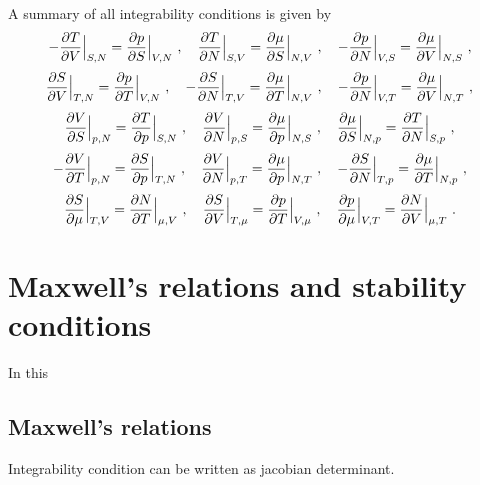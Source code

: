    A summary of all integrability conditions is given by 
    \begin{equation*}
        - \frac{\partial T}{\partial V} \Big \vert_{S,N} = \frac{\partial p}{\partial S} \Big \vert_{V,N} ~, \quad 
        \frac{\partial T}{\partial N} \Big \vert_{S,V} = \frac{\partial\mu}{\partial S} \Big \vert_{N, V} ~, \quad 
        - \frac{\partial p}{\partial N} \Big \vert_{V,S} = \frac{\partial\mu}{\partial V} \Big \vert_{N, S} ~,
    \end{equation*}
    \begin{equation*}
        \frac{\partial S}{\partial V} \Big \vert_{T,N} = \frac{\partial p}{\partial T} \Big \vert_{V,N} ~, \quad 
        - \frac{\partial S}{\partial N} \Big \vert_{T,V} = \frac{\partial\mu}{\partial T} \Big \vert_{N, V} ~, \quad 
        - \frac{\partial p}{\partial N} \Big \vert_{V,T} = \frac{\partial\mu}{\partial V} \Big \vert_{N, T} ~,
    \end{equation*}
    \begin{equation*}
        \frac{\partial V}{\partial S} \Big \vert_{p,N} = \frac{\partial T}{\partial p} \Big \vert_{S,N} ~, \quad 
        \frac{\partial V}{\partial N} \Big \vert_{p,S} = \frac{\partial\mu}{\partial p} \Big \vert_{N, S} ~, \quad 
        \frac{\partial\mu}{\partial S} \Big \vert_{N,p} = \frac{\partial T}{\partial N} \Big \vert_{S, p} ~,
    \end{equation*}
    \begin{equation*}
        - \frac{\partial V}{\partial T} \Big \vert_{p,N} = \frac{\partial S}{\partial p} \Big \vert_{T,N} ~, \quad 
        \frac{\partial V}{\partial N} \Big \vert_{p,T} = \frac{\partial\mu}{\partial p} \Big \vert_{N, T} ~, \quad 
        - \frac{\partial S}{\partial N} \Big \vert_{T,p} = \frac{\partial\mu}{\partial T} \Big \vert_{N, p} ~,
    \end{equation*}
    \begin{equation*}
        \frac{\partial S}{\partial\mu} \Big \vert_{T,V} = \frac{\partial N}{\partial T} \Big \vert_{\mu,V} ~, \quad 
        \frac{\partial S}{\partial V} \Big \vert_{T,\mu} = \frac{\partial p}{\partial T} \Big \vert_{V, \mu} ~, \quad 
        \frac{\partial p}{\partial\mu} \Big \vert_{V,T} = \frac{\partial N}{\partial V} \Big \vert_{\mu, T} ~.
    \end{equation*}

\chapter{Maxwell's relations and stability conditions}

    In this 

\section{Maxwell's relations}

    Integrability condition can be written as jacobian determinant. 

